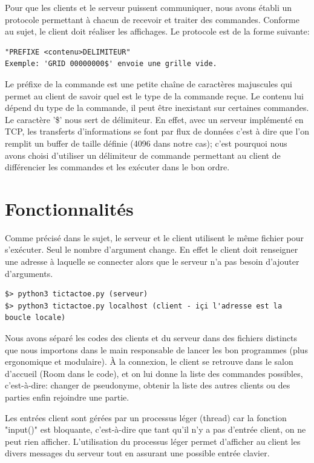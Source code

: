 \documentclass[a4paper]{article}
\begin{document}
Pour que les clients et le serveur puissent communiquer, nous avons établi un protocole permettant à chacun de recevoir et traiter des commandes. Conforme au sujet, le client doit réaliser les affichages. Le protocole est de la forme suivante:
\begin{verbatim}
"PREFIXE <contenu>DELIMITEUR"
Exemple: 'GRID 00000000$' envoie une grille vide.
\end{verbatim}

Le préfixe de la commande est une petite chaîne de caractères majuscules qui permet au client de savoir quel est le type de la commande reçue. Le contenu lui dépend du type de la commande, il peut être inexistant sur certaines commandes.
Le caractère '\$' nous sert de délimiteur. En effet, avec un serveur implémenté en TCP, les transferts d'informations se font par flux de données c'est à dire que l'on remplit un buffer de taille définie (4096 dans notre cas); c'est pourquoi nous avons choisi d'utiliser un délimiteur de commande permettant au client de différencier les commandes et les exécuter dans le bon ordre.

\section{Fonctionnalités}

Comme précisé dans le sujet, le serveur et le client utilisent le même fichier pour s'exécuter. Seul le nombre d'argument change. En effet le client doit renseigner une adresse à laquelle se connecter alors que le serveur n'a pas besoin d'ajouter d'arguments.

\begin{verbatim}
$> python3 tictactoe.py (serveur)
$> python3 tictactoe.py localhost (client - içi l'adresse est la boucle locale)
\end{verbatim}

Nous avons séparé les codes des clients et du serveur dans des fichiers distincts que nous importons dans le main responsable de lancer les bon programmes (plus ergonomique et modulaire).
À la connexion, le client se retrouve dans le salon d'accueil (Room dans le code), et on lui donne la liste des commandes possibles, c'est-à-dire:
changer de pseudonyme,
obtenir la liste des autres clients ou des parties
enfin rejoindre une partie.

Les entrées client sont gérées par un processus léger (thread) car la fonction "input()" est bloquante, c'est-à-dire que tant qu'il n'y a pas d'entrée client, on ne peut rien afficher. L'utilisation du processus léger permet d'afficher au client les divers messages du serveur tout en assurant une possible entrée clavier.
\end{document}
